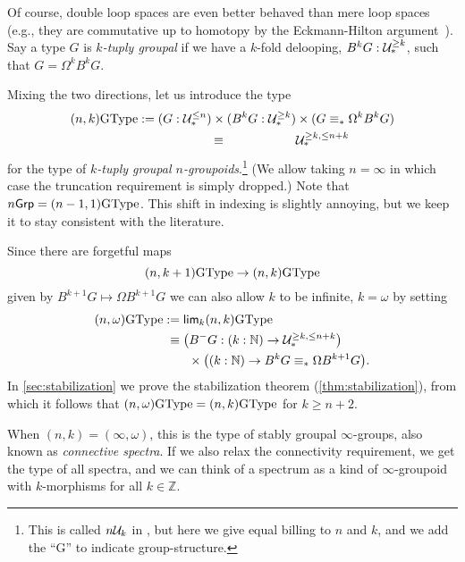 Of course, double loop spaces are even better behaved than mere loop
spaces (e.g., they are commutative up to homotopy
by the Eckmann-Hilton argument~\cite[Theorem~2.1.6]{hottbook}).
Say a type $G$ is
\emph{$k$-tuply groupal} if we have a $k$-fold delooping,
$B^kG : \mathcal{U}_\ast^{\ge k}$, such that $G = \Omega^kB^kG$.

Mixing the two directions, let us introduce the type
\begin{align*}
  (n,k)\GType
  &:= (G : \UU_\pt^{\le n}) \times (B^kG : \UU_\pt^{\ge k})
    \times (G \equiv_\pt \Omega^kB^kG) \\
  &\omit$\phantom{:}\equiv \UU_\pt^{\ge k,\le n+k}$
\end{align*}
for the type of \emph{$k$-tuply groupal $n$-groupoids}.\footnote{This
  is called $n\mathcal{U}_k$ in \cite{BaezDolan1998}, but here we give equal
  billing to $n$ and $k$,
  and we add the ``G'' to indicate group-structure.}
(We allow taking $n=\infty$ in which case the truncation requirement
is simply dropped.)
Note that $n\mathsf{Grp} = (n-1,1)\mathrm{GType}$. This shift in indexing is slightly
annoying, but we keep it to stay consistent with the literature.

Since there are forgetful maps
\begin{equation*}
(n,k+1)\mathrm{GType} \to (n,k)\mathrm{GType}
\end{equation*}
given by $B^{k+1}G\mapsto \Omega B^{k+1}G$
we can also allow $k$ to be infinite, $k=\omega$ by setting
\begin{align*}
(n,\omega)\mathrm{GType} & := \mathsf{lim}_k{}(n,k)\mathrm{GType} \\
&\phantom{:}\equiv \bigl(B^{-}G : (k : {\mathbb{N}}) \to \mathcal{U}_\ast^{\ge k,\le n+k}\bigr) \\
  &\qquad \times \bigl((k : {\mathbb{N}}) \to B^kG \equiv_\ast \Omega B^{k+1}G \bigr).
\end{align*}
In \cref{sec:stabilization} we prove the stabilization theorem
(\cref{thm:stabilization}), from which it follows that
$(n,\omega)\mathrm{GType}=(n,k)\mathrm{GType}$ for $k\geq n+2$.

When $(n,k)=(\infty,\omega)$, this is the type of stably groupal $\infty$-groups,
also known as \emph{connective spectra}. If we also relax the
connectivity requirement, we get the type of all spectra, and we can
think of a spectrum as a kind of $\infty$-groupoid with $k$-morphisms
for all $k\in\mathbb{Z}$.

